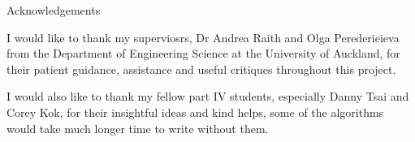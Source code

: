 \begin{center}
\Huge Acknowledgements
\end{center}
\vspace{1cm}

I would like to thank my superviosrs, Dr Andrea Raith and Olga Perederieieva from the Department of Engineering Science at the University of Auckland,
for their patient guidance, assistance and useful critiques throughout this project.

I would also like to thank my fellow part IV students, especially Danny Tsai and Corey Kok, for their insightful ideas and kind helps, some of the algorithms would take much longer time to write without them.
